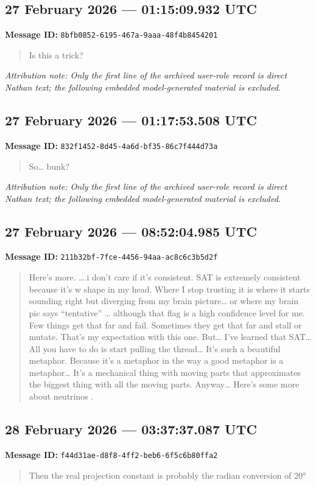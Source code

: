\documentclass[11pt,letterpaper]{article}
\newcommand{\messageentry}[3]{%
  \Needspace{7\baselineskip}
  \subsection*{#1}
  {\small\textbf{Message ID:} \texttt{#2}}
  \vspace{2pt}
}
\begin{document}
\messageentry{27 February 2026 --- 01:15:09.932 UTC}{8bfb0852-6195-467a-9aaa-48f4b8454201}{}
\begin{quote}
Is this a trick?
\end{quote}
{\small\emph{Attribution note: Only the first line of the archived user-role record is direct Nathan text; the following embedded model-generated material is excluded.}}

\messageentry{27 February 2026 --- 01:17:53.508 UTC}{832f1452-8d45-4a6d-bf35-86c7f444d73a}{}
\begin{quote}
So… bunk?
\end{quote}
{\small\emph{Attribution note: Only the first line of the archived user-role record is direct Nathan text; the following embedded model-generated material is excluded.}}

\messageentry{27 February 2026 --- 08:52:04.985 UTC}{211b32bf-7fce-4456-94aa-ac8c6c3b5d2f}{}
\begin{quote}
Here’s more. ….i don’t care if it’s consistent. SAT is extremely consistent because it’s w shape in my head. Where I stop trusting it is where it starts sounding right but diverging from my brain picture… or where my brain pic says “tentative” … although that flag is a high confidence level for me. Few things get that far and fail. Sometimes they get that far and stall or mutate. That’s my expectation with this one. But… I’ve learned that SAT… All you have to do is start pulling the thread… It’s such a beautiful metaphor. Because it’s a metaphor in the way a good metaphor is a metaphor… It’s a mechanical thing with moving parts that approximates the biggest thing with all the moving parts. Anyway… Here’s some more about neutrinos .
\end{quote}

\messageentry{28 February 2026 --- 03:37:37.087 UTC}{f44d31ae-d8f8-4ff2-beb6-6f5c6b80ffa2}{}
\begin{quote}
Then the real projection constant is probably the radian conversion of 20°
\end{quote}
\end{document}
